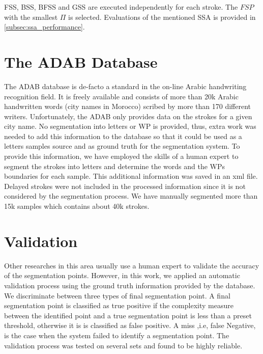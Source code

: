 \documentclass[10pt, conference, compsocconf]{IEEEtran}
\begin{document}
FSS, BSS, BFSS and GSS are executed independently for each stroke. The $FSP$ with the smallest $\Pi$ is selected. Evaluations of the mentioned SSA is provided in \ref{subsec:ssa_performance}. 



\section{The ADAB Database}
\label{sec:database}
The ADAB database is de-facto a standard in the on-line Arabic handwriting recognition field. It is freely available and consists of more than 20k Arabic handwritten words (city names in Morocco) scribed by more than 170 different writers. 
Unfortunately, the ADAB only provides data on the strokes for a given city name. 
No segmentation into letters or WP is provided, thus, extra work was needed to add this information to the database so that it could be used as a letters samples source and as ground truth for the segmentation system.
To provide this information, we have employed the skills of a human expert to segment the strokes into letters and determine the words and the WPs boundaries for each sample. 
This additional information was saved in an xml file. Delayed strokes were not included in the processed information since it is not considered by the segmentation process.
We have manually segmented more than 15k samples which contains about 40k strokes. 

\section{Validation}
\label{sec:validation}
Other researches in this area usually use a human expert to validate the accuracy of the segmentation points. However, in this work, we applied an automatic validation process using the ground truth information provided by the database. We discriminate between three types of final segmentation point. A final segmentation point is classified as true positive if the complexity measure between the identified point and a true segmentation point is less than a preset threshold, otherwise it is is classified as false positive. A miss ,i.e, false Negative, is the case when the system failed to identify a segmentation point. The validation process was tested on several sets and found to be highly reliable.

\end{document}
